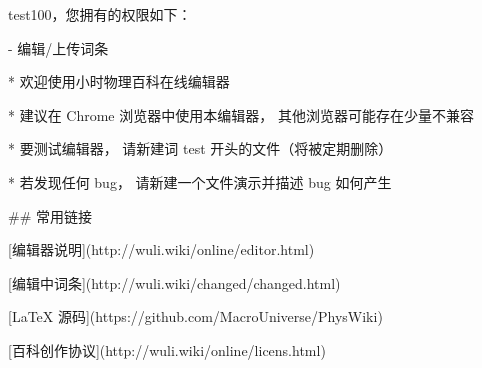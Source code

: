 test100，您拥有的权限如下：

- 编辑/上传词条

* 欢迎使用小时物理百科在线编辑器

* 建议在 Chrome 浏览器中使用本编辑器， 其他浏览器可能存在少量不兼容

* 要测试编辑器， 请新建词 test 开头的文件（将被定期删除）

* 若发现任何 bug， 请新建一个文件演示并描述 bug 如何产生

## 常用链接

[编辑器说明](http://wuli.wiki/online/editor.html)

[编辑中词条](http://wuli.wiki/changed/changed.html)

[LaTeX 源码](https://github.com/MacroUniverse/PhysWiki)

[百科创作协议](http://wuli.wiki/online/licens.html)

